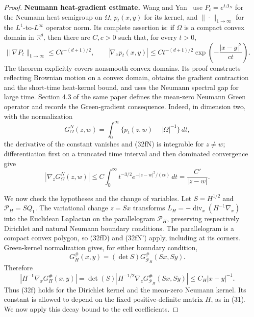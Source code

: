\documentclass{aomart}
\theoremstyle{definition}
\newcommand{\1}{\mathbf 1}
\begin{document}
\begin{proof}
\textbf{Neumann heat-gradient estimate.}  Wang and Yan~\cite[Theorem 1.2]{WangYan2010} use $P_ t=e^{t\Delta_ N}$ for the
Neumann heat semigroup on $\Omega$, $p_ t(x,y)$ for its kernel, and
$\|\cdot\|_ {1\to\infty}$ for the $L^1$-to-$L^\infty$ operator norm.
Its complete assertion is: if $\Omega$ is a compact convex domain in
$\mathbb R^d$, then there are $C,c>0$ such that, for every $t>0$,
\begin{equation}
\|\nabla P_ t\|_ {1\to\infty}\leq Ct^{-(d+1)/2},
\qquad
|\nabla_ xp_ t(x,y)|\leq Ct^{-(d+1)/2}
\exp\!\left(-\frac{|x-y|^2}{ct}\right).
\tag{32fN}
\end{equation}
The theorem explicitly covers nonsmooth convex domains.  Its proof
constructs reflecting Brownian motion on a convex domain, obtains the
gradient contraction and the short-time heat-kernel bound, and uses the
Neumann spectral gap for large time.  Section 4.3 of the same paper defines
the mean-zero Neumann Green operator and records the Green-gradient
consequence.  Indeed, in dimension two, with the normalization
\begin{equation*}
G^N_ \Omega(z,w)=\int_ 0^\infty
\{p_ t(z,w)-|\Omega|^{-1}\}\,dt,
\end{equation*}
the derivative of the constant vanishes and (32fN) is integrable for
$z\ne w$; differentiation first on a truncated time interval and then
dominated convergence give
\begin{equation}
|\nabla_ zG^N_ \Omega(z,w)|
\leq C\int_ 0^\infty t^{-3/2}
e^{-|z-w|^2/(ct)}\,dt
=\frac{C'}{|z-w|}.
\tag{32fN'}
\end{equation}

We now check the hypotheses and the change of variables.  Let
$S=H^{1/2}$ and $\mathcal P_ H=SQ_ 1$.  The variational change
$z=Sx$ transforms
$L_ H=-\operatorname {div}_ x(H^{-1}\nabla_ x)$ into the Euclidean
Laplacian on the parallelogram $\mathcal P_ H$, preserving respectively
Dirichlet and natural Neumann boundary conditions.  The parallelogram is
a compact convex polygon, so (32fD) and (32fN') apply, including at its
corners.  Green-kernel normalization gives, for either boundary condition,
\begin{equation*}
G_ H^\#(x,y)=(\det S)G_ {\mathcal P_ H}^\#(Sx,Sy).
\end{equation*}
Therefore
\begin{equation}
|H^{-1}\nabla_ xG_ H^\#(x,y)|
=\det(S)|H^{-1/2}\nabla_ zG_ {\mathcal P_ H}^\#(Sx,Sy)|
\leq C_ H|x-y|^{-1}.
\tag{32f}
\end{equation}
Thus (32f) holds for the Dirichlet kernel and the mean-zero Neumann
kernel.  Its constant is allowed to depend on the fixed
positive-definite matrix $H$, as in (31).  We now apply this decay
bound to the cell coefficients.


\end{proof}
\end{document}
